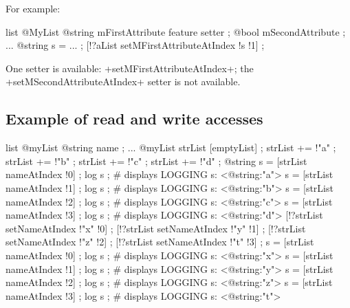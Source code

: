 For example:

\begin{galgas}
list @MyList {
  @string mFirstAttribute feature setter ;
  @bool mSecondAttribute ;
}
...
@string s = ... ;
[!?aList setMFirstAttributeAtIndex !s !1] ;
\end{galgas}

One setter is available: \ggs+setMFirstAttributeAtIndex+; the \ggs+setMSecondAttributeAtIndex+ setter is not available.

\subsection{Example of read and write accesses}

\begin{galgas}
list @myList {
  @string name ;
}
...
@myList strList [emptyList] ;
strList += !"a" ;
strList += !"b" ;
strList += !"c" ;
strList += !"d" ;
@string s = [strList nameAtIndex !0] ;
log s ; # displays LOGGING s: <@string:"a">
s = [strList nameAtIndex !1] ;
log s ; # displays LOGGING s: <@string:"b">
s = [strList nameAtIndex !2] ;
log s ; # displays LOGGING s: <@string:"c">
s = [strList nameAtIndex !3] ;
log s ; # displays LOGGING s: <@string:"d">
[!?strList setNameAtIndex !"x" !0] ;
[!?strList setNameAtIndex !"y" !1] ;
[!?strList setNameAtIndex !"z" !2] ;
[!?strList setNameAtIndex !"t" !3] ;
s = [strList nameAtIndex !0] ;
log s ; # displays LOGGING s: <@string:"x">
s = [strList nameAtIndex !1] ;
log s ; # displays LOGGING s: <@string:"y">
s = [strList nameAtIndex !2] ;
log s ; # displays LOGGING s: <@string:"z">
s = [strList nameAtIndex !3] ;
log s ; # displays LOGGING s: <@string:"t">
\end{galgas}
